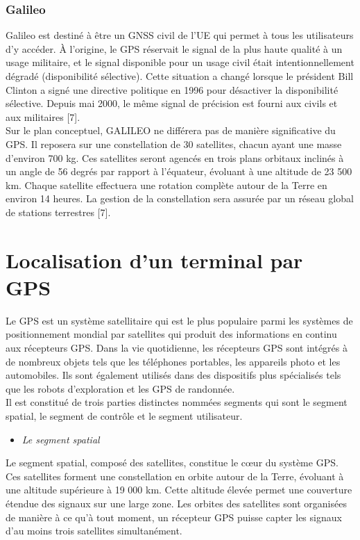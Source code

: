\subsubsection{Galileo}
Galileo est destiné à être un GNSS civil de l'UE qui permet à tous les utilisateurs d'y accéder. À l'origine, le GPS réservait le signal de la plus haute qualité à un usage militaire, et le signal disponible pour un usage civil était intentionnellement dégradé (disponibilité sélective). Cette situation a changé lorsque le président Bill Clinton a signé une directive politique en 1996 pour désactiver la disponibilité sélective. Depuis mai 2000, le même signal de précision est fourni aux civils et aux militaires [7].\\

Sur le plan conceptuel, GALILEO ne différera pas de manière significative du GPS. Il reposera sur une constellation de 30 satellites, chacun ayant une masse d'environ 700 kg. Ces satellites seront agencés en trois plans orbitaux inclinés à un angle de 56 degrés par rapport à l'équateur, évoluant à une altitude de 23 500 km. Chaque satellite effectuera une rotation complète autour de la Terre en environ 14 heures. La gestion de la constellation sera assurée par un réseau global de stations terrestres [7].

\section{Localisation d’un terminal par GPS}
Le GPS est un système satellitaire qui est le plus populaire parmi les systèmes de positionnement mondial par satellites qui produit des informations en continu aux récepteurs GPS. Dans la vie quotidienne, les récepteurs GPS sont intégrés à de nombreux objets tels que les téléphones portables, les appareils photo et les automobiles. Ils sont également utilisés dans des dispositifs plus spécialisés tels que les robots d'exploration et les GPS de randonnée.\\

Il est constitué de trois parties distinctes nommées segments qui sont le segment spatial, le segment de contrôle et le segment utilisateur.

\begin{itemize}[label=-]
\item \textit{Le segment spatial}
\end{itemize}


Le segment spatial, composé des satellites, constitue le cœur du système GPS. Ces satellites forment une constellation en orbite autour de la Terre, évoluant à une altitude supérieure à 19 000 km. Cette altitude élevée permet une couverture étendue des signaux sur une large zone. Les orbites des satellites sont organisées de manière à ce qu'à tout moment, un récepteur GPS puisse capter les signaux d'au moins trois satellites simultanément.\\

